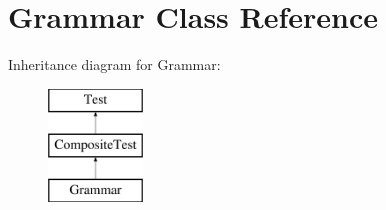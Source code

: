 \hypertarget{class_grammar}{}\section{Grammar Class Reference}
\label{class_grammar}
Inheritance diagram for Grammar\+:\begin{figure}[H]
\begin{center}
\leavevmode
\includegraphics[height=3.000000cm]{class_grammar}
\end{center}
\end{figure}
